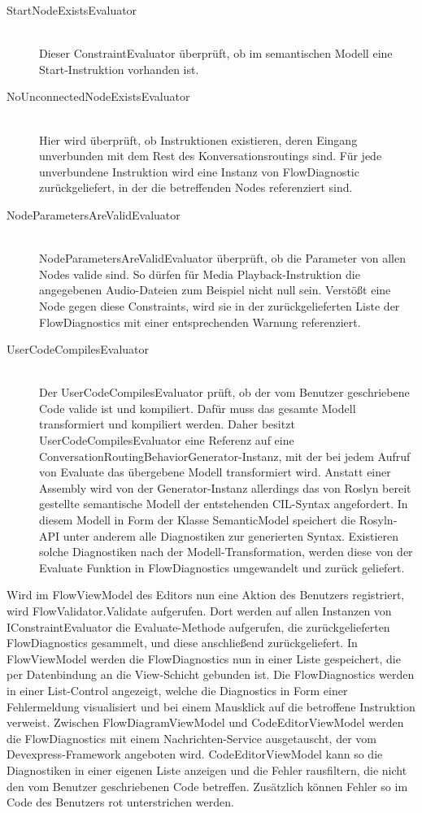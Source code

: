 \begin{description}
\item[StartNodeExistsEvaluator] \hfill \\
Dieser ConstraintEvaluator überprüft, ob im semantischen Modell eine Start-Instruktion vorhanden ist.
\item[NoUnconnectedNodeExistsEvaluator] \hfill \\
Hier wird überprüft, ob Instruktionen existieren, deren Eingang unverbunden mit dem Rest des Konversationsroutings sind. Für jede unverbundene Instruktion wird eine Instanz von FlowDiagnostic zurückgeliefert, in der die betreffenden Nodes referenziert sind.
\item[NodeParametersAreValidEvaluator] \hfill \\
NodeParametersAreValidEvaluator überprüft, ob die Parameter von allen Nodes valide sind. So dürfen für Media Playback-Instruktion die angegebenen Audio-Dateien zum Beispiel nicht null sein. Verstößt eine Node gegen diese Constraints, wird sie in der zurückgelieferten Liste der FlowDiagnostics mit einer entsprechenden Warnung referenziert.
\item[UserCodeCompilesEvaluator] \hfill \\
Der UserCodeCompilesEvaluator prüft, ob der vom Benutzer geschriebene Code valide ist und kompiliert. Dafür muss das gesamte Modell transformiert und kompiliert werden. Daher besitzt UserCodeCompilesEvaluator eine Referenz auf eine ConversationRoutingBehaviorGenerator-Instanz, mit der bei jedem Aufruf von Evaluate das übergebene Modell transformiert wird. Anstatt einer Assembly wird von der Generator-Instanz allerdings das von Roslyn bereit gestellte semantische Modell der entstehenden CIL-Syntax angefordert. In diesem Modell in Form der Klasse SemanticModel speichert die Rosyln-API unter anderem alle Diagnostiken zur generierten Syntax. Existieren solche Diagnostiken nach der Modell-Transformation, werden diese von der Evaluate Funktion in FlowDiagnostics umgewandelt und zurück geliefert.
\end{description}
Wird im FlowViewModel des Editors nun eine Aktion des Benutzers registriert, wird FlowValidator.Validate aufgerufen. Dort werden auf allen Instanzen von IConstraintEvaluator die Evaluate-Methode aufgerufen, die zurückgelieferten FlowDiagnostics gesammelt, und diese anschließend zurückgeliefert. In FlowViewModel werden die FlowDiagnostics nun in einer Liste gespeichert, die per Datenbindung an die View-Schicht gebunden ist. Die FlowDiagnostics werden in einer List-Control angezeigt, welche die Diagnostics in Form einer Fehlermeldung visualisiert und bei einem Mausklick auf die betroffene Instruktion verweist. Zwischen FlowDiagramViewModel und CodeEditorViewModel werden die FlowDiagnostics mit einem Nachrichten-Service ausgetauscht, der vom Devexpress-Framework angeboten wird. CodeEditorViewModel kann so die Diagnostiken in einer eigenen Liste anzeigen und die Fehler rausfiltern, die nicht den vom Benutzer geschriebenen Code betreffen. Zusätzlich können Fehler so im Code des Benutzers rot unterstrichen werden.